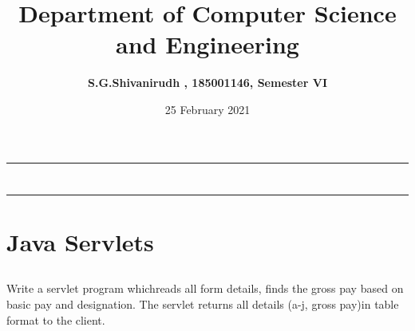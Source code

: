 \documentclass[12pt,letterpaper]{article}
\title{\textbf{Department of Computer Science and Engineering}}
\author{\textbf{S.G.Shivanirudh , 185001146, Semester VI }}
\date{25 February 2021}
\begin{document}
\maketitle
\hrule
\section*{}
\hrule 
\bigskip\bigskip

\section*{}

\section*{Java Servlets}
\subsection*{}
\begin{flushleft}
    Write a servlet program whichreads all form details, finds the gross pay based on basic pay and designation. 
    The servlet returns all details (a-j, gross pay)in table format to the client.
\end{flushleft}

\subsection*{}
\subsubsection*{}
\begin{flushleft}

\end{flushleft}

\subsubsection*{{}}
\begin{flushleft}
    
\end{flushleft}

\subsubsection*{{}}
\begin{flushleft}
    
\end{flushleft}
\end{document}
